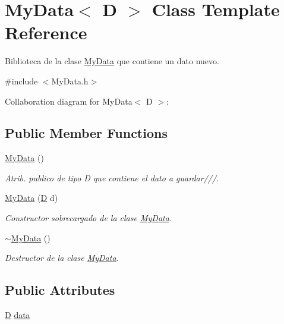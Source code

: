 \hypertarget{class_my_data}{\section{My\+Data$<$ D $>$ Class Template Reference}
\label{class_my_data}
}


Biblioteca de la clase \hyperlink{class_my_data}{My\+Data} que contiene un dato nuevo.  




{\ttfamily \#include $<$My\+Data.\+h$>$}



Collaboration diagram for My\+Data$<$ D $>$\+:
\subsection*{Public Member Functions}
\begin{DoxyCompactItemize}
\item 
\hyperlink{class_my_data_a93f4c76f09dfbb43ab368ef60c90af9b}{My\+Data} ()
\begin{DoxyCompactList}\small\item\em Atrib. publico de tipo D que contiene el dato a guardar///. \end{DoxyCompactList}\item 
\hyperlink{class_my_data_af6aba41d2e64bad8b50f189ca2f8bd89}{My\+Data} (\hyperlink{gwp_2main_8cpp_af316c33cc298530f245e8b55330e86b5}{D} d)
\begin{DoxyCompactList}\small\item\em Constructor sobrecargado de la clase \hyperlink{class_my_data}{My\+Data}. \end{DoxyCompactList}\item 
\hyperlink{class_my_data_a164c35420ab34a52bce9c5695a43031d}{$\sim$\+My\+Data} ()
\begin{DoxyCompactList}\small\item\em Destructor de la clase \hyperlink{class_my_data}{My\+Data}. \end{DoxyCompactList}\end{DoxyCompactItemize}
\subsection*{Public Attributes}
\begin{DoxyCompactItemize}
\item 
\hyperlink{gwp_2main_8cpp_af316c33cc298530f245e8b55330e86b5}{D} \hyperlink{class_my_data_a13fb58c5e026ab5f67f090296a0d3775}{data}
\end{DoxyCompactItemize}



